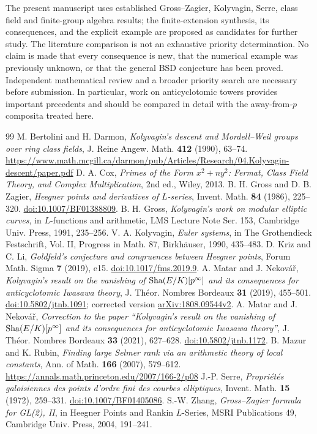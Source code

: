 \documentclass[11pt,a4paper]{article}
\numberwithin{equation}{section}
\begin{document}
The present manuscript uses established Gross--Zagier, Kolyvagin, Serre, class field and finite-group algebra results; the finite-extension synthesis, its consequences, and the explicit example are proposed as candidates for further study. The literature comparison is not an exhaustive priority determination. No claim is made that every consequence is new, that the numerical example was previously unknown, or that the general BSD conjecture has been proved. Independent mathematical review and a broader priority search are necessary before submission. In particular, work on anticyclotomic towers \cite{MN,MNcorr} provides important precedents and should be compared in detail with the away-from-$p$ composita treated here.
\begin{thebibliography}{99}\small
{} M. Bertolini and H. Darmon, \emph{Kolyvagin's descent and Mordell--Weil groups over ring class fields}, J. Reine Angew. Math. \textbf{412} (1990), 63--74. \url{https://www.math.mcgill.ca/darmon/pub/Articles/Research/04.Kolyvagin-descent/paper.pdf}
 D. A. Cox, \emph{Primes of the Form $x^2+ny^2$: Fermat, Class Field Theory, and Complex Multiplication}, 2nd ed., Wiley, 2013.
 B. H. Gross and D. B. Zagier, \emph{Heegner points and derivatives of $L$-series}, Invent. Math. \textbf{84} (1986), 225--320. \href{https://doi.org/10.1007/BF01388809}{doi:10.1007/BF01388809}.
 B. H. Gross, \emph{Kolyvagin's work on modular elliptic curves}, in $L$-functions and arithmetic, LMS Lecture Note Ser. 153, Cambridge Univ. Press, 1991, 235--256.
 V. A. Kolyvagin, \emph{Euler systems}, in The Grothendieck Festschrift, Vol. II, Progress in Math. 87, Birkh\"auser, 1990, 435--483.
 D. Kriz and C. Li, \emph{Goldfeld's conjecture and congruences between Heegner points}, Forum Math. Sigma \textbf{7} (2019), e15. \href{https://doi.org/10.1017/fms.2019.9}{doi:10.1017/fms.2019.9}.
 A. Matar and J. Nekov\'a\v{r}, \emph{Kolyvagin's result on the vanishing of $\operatorname{Sha}(E/K)[p^\infty]$ and its consequences for anticyclotomic Iwasawa theory}, J. Th\'eor. Nombres Bordeaux \textbf{31} (2019), 455--501. \href{https://doi.org/10.5802/jtnb.1091}{doi:10.5802/jtnb.1091}; corrected version \href{https://arxiv.org/abs/1808.09544}{arXiv:1808.09544v2}.
 A. Matar and J. Nekov\'a\v{r}, \emph{Correction to the paper ``Kolyvagin's result on the vanishing of $\operatorname{Sha}(E/K)[p^\infty]$ and its consequences for anticyclotomic Iwasawa theory''}, J. Th\'eor. Nombres Bordeaux \textbf{33} (2021), 627--628. \href{https://doi.org/10.5802/jtnb.1172}{doi:10.5802/jtnb.1172}.
 B. Mazur and K. Rubin, \emph{Finding large Selmer rank via an arithmetic theory of local constants}, Ann. of Math. \textbf{166} (2007), 579--612. \url{https://annals.math.princeton.edu/2007/166-2/p08}
 J.-P. Serre, \emph{Propri\'et\'es galoisiennes des points d'ordre fini des courbes elliptiques}, Invent. Math. \textbf{15} (1972), 259--331. \href{https://doi.org/10.1007/BF01405086}{doi:10.1007/BF01405086}.
 S.-W. Zhang, \emph{Gross--Zagier formula for GL(2), II}, in Heegner Points and Rankin $L$-Series, MSRI Publications 49, Cambridge Univ. Press, 2004, 191--241.
\end{thebibliography}
\end{document}
